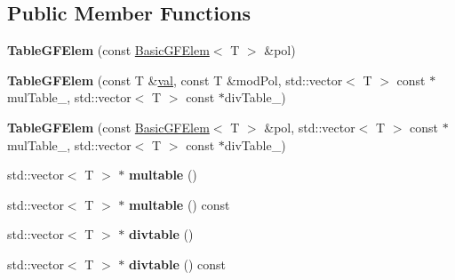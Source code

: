 \subsection*{Public Member Functions}
\begin{DoxyCompactItemize}
\item 
\mbox{\label{class_g_flinalg_1_1_table_g_f_elem_a846c8e8af76c24658fe2bbac571e6741}} 
{\bfseries Table\+G\+F\+Elem} (const \mbox{\hyperlink{class_g_flinalg_1_1_basic_g_f_elem}{Basic\+G\+F\+Elem}}$<$ T $>$ \&pol)
\item 
\mbox{\label{class_g_flinalg_1_1_table_g_f_elem_a82be49d3af16d1afdc7612d1e6333a56}} 
{\bfseries Table\+G\+F\+Elem} (const T \&\mbox{\hyperlink{class_g_flinalg_1_1_basic_g_f_elem_ab8acf4373ba8172d801228d16efcc1d0}{val}}, const T \&mod\+Pol, std\+::vector$<$ T $>$ const $\ast$mul\+Table\+\_\+, std\+::vector$<$ T $>$ const $\ast$div\+Table\+\_\+)
\item 
\mbox{\label{class_g_flinalg_1_1_table_g_f_elem_a7f1fc393efd667baf1e0899159030ab2}} 
{\bfseries Table\+G\+F\+Elem} (const \mbox{\hyperlink{class_g_flinalg_1_1_basic_g_f_elem}{Basic\+G\+F\+Elem}}$<$ T $>$ \&pol, std\+::vector$<$ T $>$ const $\ast$mul\+Table\+\_\+, std\+::vector$<$ T $>$ const $\ast$div\+Table\+\_\+)
\item 
\mbox{\label{class_g_flinalg_1_1_table_g_f_elem_a368067aabe6b25e730f252fd2e99f98e}} 
std\+::vector$<$ T $>$ $\ast$ {\bfseries multable} ()
\item 
\mbox{\label{class_g_flinalg_1_1_table_g_f_elem_ad6faba62cd27bd35a944a147eec0f406}} 
std\+::vector$<$ T $>$ $\ast$ {\bfseries multable} () const
\item 
\mbox{\label{class_g_flinalg_1_1_table_g_f_elem_af19a5349aa6455605e0007c7697fbf0e}} 
std\+::vector$<$ T $>$ $\ast$ {\bfseries divtable} ()
\item 
\mbox{\label{class_g_flinalg_1_1_table_g_f_elem_a5eba1fe856503dc4cee9100eb1eb6781}} 
std\+::vector$<$ T $>$ $\ast$ {\bfseries divtable} () const

\end{DoxyCompactItemize}
